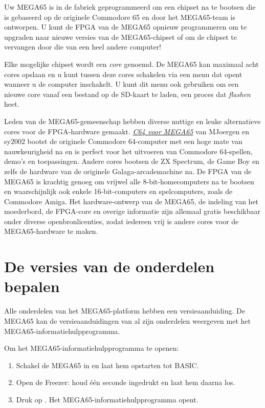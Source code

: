 Uw MEGA65 is in de fabriek geprogrammeerd om een chipset na te bootsen die is gebaseerd op de originele Commodore 65 en door het MEGA65-team is ontworpen. U kunt de FPGA van de MEGA65 opnieuw programmeren om te upgraden naar nieuwe versies van de MEGA65-chipset of om de chipset te vervangen door die van een heel andere computer!

Elke mogelijke chipset wordt een {\em core} genoemd. De MEGA65 kan maximaal acht cores opslaan en u kunt tussen deze cores schakelen via een menu dat opent wanneer u de computer inschakelt. U kunt dit menu ook gebruiken om een nieuwe core vanaf een bestand op de SD-kaart te laden, een proces dat {\em flashen} heet.

Leden van de MEGA65-gemeenschap hebben diverse nuttige en leuke alternatieve cores voor de FPGA-hardware gemaakt. \href{https://github.com/MJoergen/C64MEGA65}{{\em C64 voor MEGA65}} van MJoergen en sy2002 bootst de originele Commodore 64-computer met een hoge mate van nauwkeurigheid na en is perfect voor het uitvoeren van Commodore 64-spellen, demo's en toepassingen. Andere cores bootsen de ZX Spectrum, de Game Boy en zelfs de hardware van de originele Galaga-arcademachine na. De FPGA van de MEGA65 is krachtig genoeg om vrijwel alle 8-bit-homecomputers na te bootsen en waarschijnlijk ook enkele 16-bit-computers en spelcomputers, zoals de Commodore Amiga. Het hardware-ontwerp van de MEGA65, de indeling van het moederbord, de FPGA-core en overige informatie zijn allemaal gratis beschikbaar onder diverse openbronlicenties, zodat iedereen vrij is andere cores voor de MEGA65-hardware te maken.

\section{De versies van de onderdelen bepalen}
\label{sec:versions}

Alle onderdelen van het MEGA65-platform hebben een versieaanduiding. De MEGA65 kan de versieaanduidingen van al zijn onderdelen weergeven met het MEGA65-informatiehulpprogramma.

Om het MEGA65-informatiehulpprogramma te openen:

\begin{enumerate}
  \item Schakel de MEGA65 in en laat hem opstarten tot BASIC.  \item Open de Freezer: houd  één seconde ingedrukt en laat hem daarna los.  \item Druk op . Het MEGA65-informatiehulpprogramma opent.
\end{enumerate}

